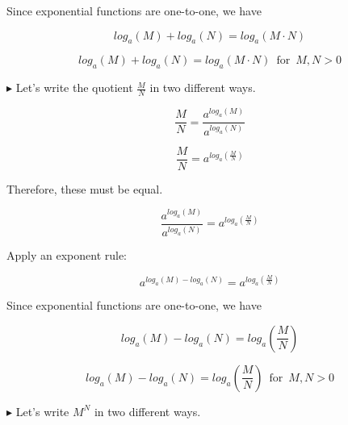 \documentclass{ximera}
\begin{document}
Since exponential functions are one-to-one, we have 


\[    log_a(M)+log_a(N)    =   log_a(M \cdot N)               \]




\begin{fact} 

\[    log_a(M)+log_a(N)    =   log_a(M \cdot N)      \, \text{ for } \, M, N > 0        \]


\end{fact}




$\blacktriangleright$  Let's write the quotient $\frac{M}{N}$ in two different ways.



\[   \frac{M}{N} = \frac{a^{log_a(M)}}{a^{log_a(N)}}                    \]

\[   \frac{M}{N} = a^{log_a\left(\frac{M}{N}\right)}                  \]


Therefore, these must be equal.


\[    \frac{a^{log_a(M)}}{a^{log_a(N)}}    =   a^{log_a\left(\frac{M}{N}\right)}                \]


Apply an exponent rule:


\[    a^{log_a(M) - log_a(N)}    =   a^{log_a\left(\frac{M}{N}\right)}                \]



Since exponential functions are one-to-one, we have 


\[    log_a(M)-log_a(N)    =   log_a\left(\frac{M}{N}\right)             \]








\begin{fact} 

\[    log_a(M)-log_a(N)    =   log_a\left(\frac{M}{N}\right)        \, \text{ for } \, M, N > 0        \]


\end{fact}




















$\blacktriangleright$  Let's write $M^N$ in two different ways.
\end{document}
